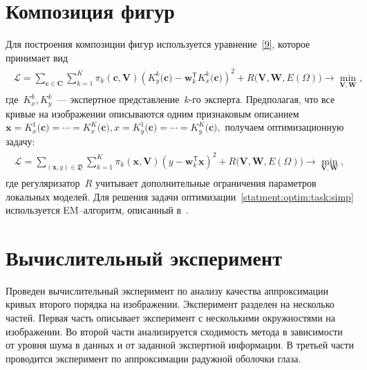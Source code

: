\documentclass[12pt]{a&t}
\begin{document}
\section{Композиция фигур}
Для построения композиции фигур используется уравнение~\eqref{9}, которое принимает вид
\begin{gather} 
\label{statment:optim:task}
\begin{aligned}
\mathcal{L} = \sum\limits_{\mathbf{c} \in \mathbf{C}} \sum\limits_{k = 1}^{K} \pi_k(\mathbf{c}, \mathbf{V})\left(K^{k}_y\bigr(\mathbf{c}\bigr) - \mathbf{w}_k^{\mathsf{T}}K^{k}_x\bigr(\mathbf{c}\bigr)\right)^2 + R\bigl(\mathbf{V}, \mathbf{W}, E(\Omega)\bigr) \rightarrow \min_{\mathbf{V}, \mathbf{W}},
\end{aligned}
\end{gather}
где~$K^{k}_x, K^{k}_y$~--- экспертное представление~$k$-го эксперта. Предполагая, что все кривые на изображении описываются одним признаковым описанием~$\mathbf{x} =K^{1}_x\bigr(\mathbf{c}\bigr)=\cdots=K^{K}_x\bigr( \mathbf{c}\bigr), x= K^{1}_y\bigr(\mathbf{c}\bigr)=\cdots=K^{K}_y\bigr(\mathbf{c}\bigr),$ получаем оптимизационную задачу:
\begin{gather} 
\label{statment:optim:task:simp}
\begin{aligned}
\mathcal{L} = \sum\limits_{\left(\mathbf{x}, y\right) \in \mathfrak{D}} \sum\limits_{k = 1}^{K} \pi_k(\mathbf{x}, \mathbf{V})\left(y - \mathbf{w}_k^{\mathsf{T}}\mathbf{x}\right)^2 + R\bigl(\mathbf{V}, \mathbf{W}, E(\Omega)\bigr) \rightarrow \min_{\mathbf{V}, \mathbf{W}},
\end{aligned}
\end{gather}
где регуляризатор~$R$ учитывает дополнительные ограничения параметров локальных моделей. Для решения задачи оптимизации~\eqref{statment:optim:task:simp} используется EM--алгоритм, описанный в~\cite{Grabovoy2021}.

\section{Вычислительный эксперимент}

Проведен вычислительный эксперимент по анализу качества аппроксимации кривых второго порядка на изображении. Эксперимент разделен на несколько частей. Первая часть описывает эксперимент с несколькими окружностями на изображении. Во второй части анализируется сходимость метода в зависимости от уровня шума в данных и от заданной экспертной информации. В третьей части проводится эксперимент по аппроксимации радужной оболочки глаза.
\end{document}
